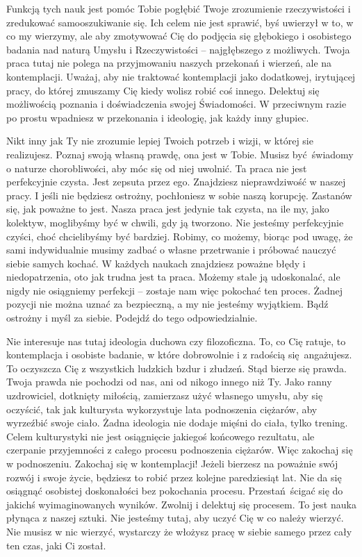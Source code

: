 Funkcją tych nauk jest pomóc Tobie pogłębić Twoje zrozumienie rzeczywistości i zredukować samooszukiwanie się.
Ich celem nie jest sprawić, byś uwierzył w to, w co my wierzymy, 
ale aby zmotywować Cię do podjęcia się głębokiego i osobistego badania nad naturą Umysłu i Rzeczywistości 
-- najgłębszego z możliwych.
Twoja praca tutaj nie polega na przyjmowaniu naszych przekonań i wierzeń, ale na kontemplacji.
Uważaj, aby nie traktować kontemplacji jako dodatkowej, irytującej pracy, do której zmuszamy Cię kiedy wolisz robić coś innego.
Delektuj się możliwością poznania i doświadczenia swojej Świadomości.
W przeciwnym razie po prostu wpadniesz w przekonania i ideologię, jak każdy inny głupiec.

Nikt inny jak Ty nie zrozumie lepiej Twoich potrzeb i wizji, w której sie realizujesz.
Poznaj swoją własną prawdę, ona jest w Tobie.
Musisz być świadomy o naturze chorobliwości, aby móc się od niej uwolnić.
Ta praca nie jest perfekcyjnie czysta.
Jest zepsuta przez ego.
Znajdziesz nieprawdziwość w naszej pracy.
I jeśli nie będziesz ostrożny, pochłoniesz w sobie naszą korupcję.
Zastanów się, jak poważne to jest.
Nasza praca jest jedynie tak czysta, na ile my, jako kolektyw, moglibyśmy być w chwili, gdy ją tworzono.
Nie jesteśmy perfekcyjnie czyści, choć chcielibyśmy być bardziej.
Robimy, co możemy, biorąc pod uwagę, 
że sami indywidualnie musimy zadbać o własne przetrwanie i próbować nauczyć siebie samych kochać.
W każdych naukach znajdziesz poważne błędy i niedopatrzenia, oto jak trudna jest ta praca.
Możemy stale ją udoskonalać, ale nigdy nie osiągniemy perfekcji -- zostaje nam więc pokochać ten proces.
Żadnej pozycji nie można uznać za bezpieczną, a my nie jesteśmy wyjątkiem.
Bądź ostrożny i myśl za siebie.
Podejdź do tego odpowiedzialnie.

Nie interesuje nas tutaj ideologia duchowa czy filozoficzna.
To, co Cię ratuje, to kontemplacja i osobiste badanie, w które dobrowolnie i z radością się angażujesz.
To oczyszcza Cię z wszystkich ludzkich bzdur i złudzeń.
Stąd bierze się prawda.
Twoja prawda nie pochodzi od nas, ani od nikogo innego niż Ty.
Jako ranny uzdrowiciel, dotknięty miłością, zamierzasz użyć własnego umysłu, aby się oczyścić, 
tak jak kulturysta wykorzystuje lata podnoszenia ciężarów, aby wyrzeźbić swoje ciało.
Żadna ideologia nie dodaje mięśni do ciała, tylko trening.
Celem kulturystyki nie jest osiągnięcie jakiegoś końcowego rezultatu, 
ale czerpanie przyjemności z całego procesu podnoszenia ciężarów.
Więc zakochaj się w podnoszeniu.
Zakochaj się w kontemplacji!
Jeżeli bierzesz na poważnie swój rozwój i swoje życie, będziesz to robić przez kolejne paredziesiąt lat.
Nie da się osiągnąć osobistej doskonałości bez pokochania procesu.
Przestań ścigać się do jakichś wyimaginowanych wyników.
Zwolnij i delektuj się procesem.
To jest nauka płynąca z naszej sztuki.
Nie jesteśmy tutaj, aby uczyć Cię w co należy wierzyć.
Nie musisz w nic wierzyć, wystarczy że włożysz pracę w siebie samego przez cały ten czas, jaki Ci został.

